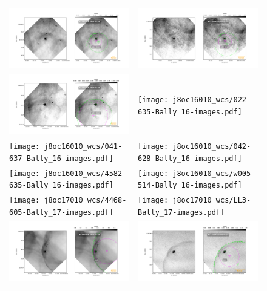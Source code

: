 \begin{figure}[htp]
\centering
\begin{tabular}{|l|l|}
\hline
     \includegraphics[width=0.47\linewidth,  trim=60 50 100 50, clip]{j8oc14010_wcs/136-3057-Bally_14-images.pdf}
    &\includegraphics[width=0.47\linewidth,  trim=60 50 100 50, clip]{j8oc14010_wcs/138-3024-Bally_14-images.pdf}\\ \hline
    \includegraphics[width=0.47\linewidth,  trim=60 50 100 50, clip]{j8oc14010_wcs/203-3039-Bally_14-images.pdf}
    &\texttt{[image: j8oc16010\_wcs/022-635-Bally\_16-images.pdf]}\\ \hline
    \texttt{[image: j8oc16010\_wcs/041-637-Bally\_16-images.pdf]} 
    &\texttt{[image: j8oc16010\_wcs/042-628-Bally\_16-images.pdf]}\\ \hline
     \texttt{[image: j8oc16010\_wcs/4582-635-Bally\_16-images.pdf]}
    &\texttt{[image: j8oc16010\_wcs/w005-514-Bally\_16-images.pdf]}\\ \hline
    \texttt{[image: j8oc17010\_wcs/4468-605-Bally\_17-images.pdf]}
    &\texttt{[image: j8oc17010\_wcs/LL3-Bally\_17-images.pdf]}\\ \hline
    \includegraphics[width=0.47\linewidth,  trim=60 50 100 50, clip]{j8oc18010_wcs/LL2-Bally_18-images.pdf}
    &\includegraphics[width=0.47\linewidth,  trim=60 50 100 50, clip]{j8oc24010_wcs/LL4-Bally_24-images.pdf}\\ \hline
   

\end{tabular}
\end{figure}

